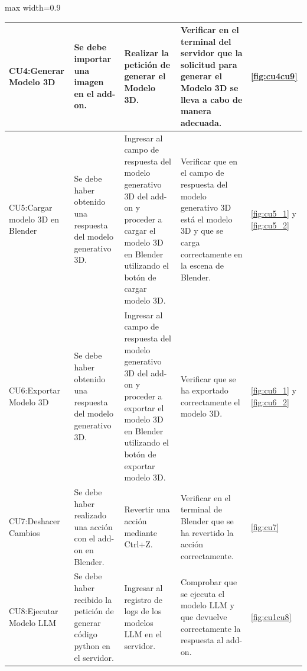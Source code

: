 \begin{table}[h!tb]
\begin{adjustbox}{max width=0.9\textwidth}
\begin{tabular}{|p{4cm}|p{4cm}|p{4cm}|p{4cm}|p{2cm}|}
      CU4:Generar Modelo 3D               & Se debe importar una imagen en el add-on.                                   & Realizar la petición de generar el Modelo 3D.                                                                                                               & Verificar en el terminal del servidor que la solicitud para generar el Modelo 3D se lleva a cabo de manera adecuada.                    & \ref{fig:cu4cu9}                                   \\ \hline

      CU5:Cargar modelo 3D en Blender     & Se debe haber obtenido una respuesta del modelo generativo 3D.              & Ingresar al campo de respuesta del modelo generativo 3D del add-on y proceder a cargar el modelo 3D en Blender utilizando el botón de cargar modelo 3D.     & Verificar que en el campo de respuesta del modelo generativo 3D está el modelo 3D y que se carga correctamente en la escena de Blender. & \ref{fig:cu5_1} y \ref{fig:cu5_2}                  \\ \hline

      CU6:Exportar Modelo 3D              & Se debe haber obtenido una respuesta del modelo generativo 3D.              & Ingresar al campo de respuesta del modelo generativo 3D del add-on y proceder a exportar el modelo 3D en Blender utilizando el botón de exportar modelo 3D. & Verificar que se ha exportado correctamente el modelo 3D.                                                                               & \ref{fig:cu6_1} y \ref{fig:cu6_2}                  \\ \hline

      CU7:Deshacer Cambios                & Se debe haber realizado una acción con el add-on en Blender.                & Revertir una acción mediante Ctrl+Z.                                                                                                                        & Verificar en el terminal de Blender que se ha revertido la acción correctamente.                                                        & \ref{fig:cu7}                                      \\ \hline

      CU8:Ejecutar Modelo LLM             & Se debe haber recibido la petición de generar código python en el servidor. & Ingresar al registro de logs de los modelos LLM en el servidor.                                                                                             & Comprobar que se ejecuta el modelo LLM y que devuelve correctamente la respuesta al add-on.                                             & \ref{fig:cu1cu8}                                   \\ \hline


\end{tabular}
\end{adjustbox}
\end{table}
